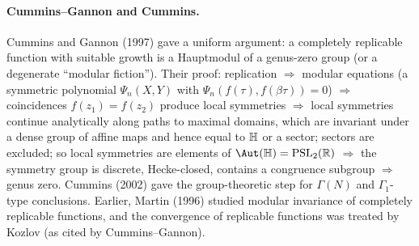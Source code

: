 \paragraph{Cummins--Gannon and Cummins.}  Cummins and Gannon (1997) gave a uniform argument: a completely replicable function with
suitable growth is a Hauptmodul of a genus-zero group (or a degenerate ``modular fiction'').  Their proof: replication $\Rightarrow$ modular
equations (a symmetric polynomial $\Psi_n(X,Y)$ with $\Psi_n(f(\tau),f(\beta\tau))=0$) $\Rightarrow$ coincidences $f(z_1)=f(z_2)$ produce local
symmetries $\Rightarrow$ local symmetries continue analytically along paths to maximal domains, which are invariant under a dense group of affine
maps and hence equal to $\mathbb{H}$ or a sector; sectors are excluded; so local symmetries are elements of $\Aut(\chnineteenH)=\mathrm{PSL}_2(\chnineteenR)$
$\Rightarrow$ the symmetry group is discrete, Hecke-closed, contains a congruence subgroup $\Rightarrow$ genus zero.  Cummins (2002) gave the
group-theoretic step for $\Gamma(N)$ and $\Gamma_1$-type conclusions.  Earlier, Martin (1996) studied modular invariance of completely
replicable functions, and the convergence of replicable functions was treated by Kozlov (as cited by Cummins--Gannon).

